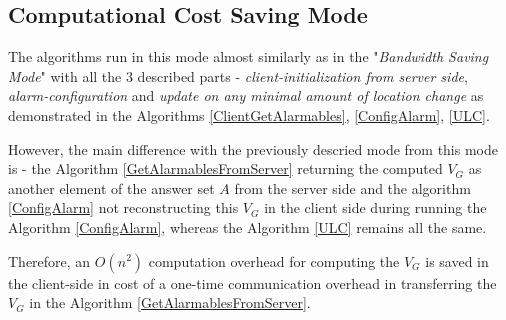 \subsection{Computational Cost Saving Mode}
The algorithms run in this mode almost similarly as in the "\textit{Bandwidth Saving Mode}" with all the 3 described parts - \textit{client-initialization from server side}, \textit{alarm-configuration} and \textit{update on any minimal amount of location change} as demonstrated in the Algorithms \ref{ClientGetAlarmables}, \ref{ConfigAlarm}, \ref{ULC}.

However, the main difference with the previously descried mode from this mode is - the Algorithm \ref{GetAlarmablesFromServer} returning the computed $V_G$ as another element of the answer set $A$ from the server side and the algorithm \ref{ConfigAlarm} not reconstructing this $V_G$ in the client side during running the Algorithm \ref{ConfigAlarm}, whereas the Algorithm \ref{ULC} remains all the same.

Therefore, an $O(n^2)$ computation overhead for computing the $V_G$ is saved in the client-side in cost of a one-time communication overhead in transferring the $V_G$ in the Algorithm \ref{GetAlarmablesFromServer}.\\


















